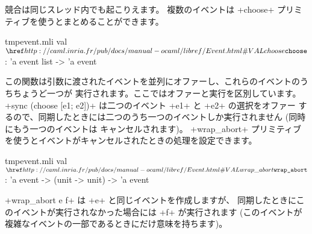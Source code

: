 競合は同じスレッド内でも起こりえます。
複数のイベントは \ml+choose+ プリミティブを使うとまとめることができます。
%
\begin{listingcodefile}{tmpevent.mli}
val $\indexlibvalue{Event}{choose}$ : 'a event list -> 'a event
\end{listingcodefile}
%
この関数は引数に渡されたイベントを並列にオファーし、これらのイベントのうちちょうど一つが
実行されます。ここではオファーと実行を区別しています。
\ml+sync (choose [e1; e2])+ は二つのイベント \ml+e1+ と \ml+e2+ の選択をオファー
するので、同期したときには二つのうち一つのイベントしか実行されません (同時にもう一つのイベントは
キャンセルされます)。
\ml+wrap_abort+ プリミティブを使うとイベントがキャンセルされたときの処理を設定できます。
%
\begin{listingcodefile}{tmpevent.mli}
val $\indexlibvalue{Event}{wrap\_abort}$ : 'a event -> (unit -> unit) -> 'a event
\end{listingcodefile}
%
\ml+wrap_abort e f+ は \ml+e+ と同じイベントを作成しますが、
同期したときにこのイベントが実行されなかった場合には \ml+f+ が実行されます
(このイベントが複雑なイベントの一部であるときにだけ意味を持ちます)。

